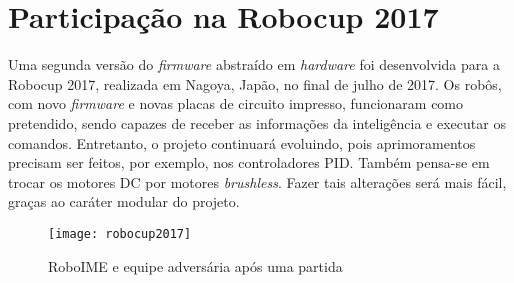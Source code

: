 \chapter{Participação na Robocup 2017}\label{cap:robocup_2017}

Uma segunda versão do \textit{firmware} abstraído em \textit{hardware} foi desenvolvida para a Robocup 2017, realizada em Nagoya, Japão, no final de julho de  2017. Os robôs, com novo \textit{firmware} e novas placas de circuito impresso, funcionaram como pretendido, sendo capazes de receber as informações da inteligência e executar os comandos. Entretanto, o projeto continuará evoluindo, pois aprimoramentos precisam ser feitos, por exemplo, nos controladores PID. Também pensa-se em trocar os motores DC por motores \textit{brushless}. Fazer tais alterações será mais fácil, graças ao caráter modular do projeto.

\begin{figure}
	\centering
	\texttt{[image: robocup2017]}
	\caption{RoboIME e equipe adversária após uma partida}
	\label{fig:robocup_2017}
\end{figure}



